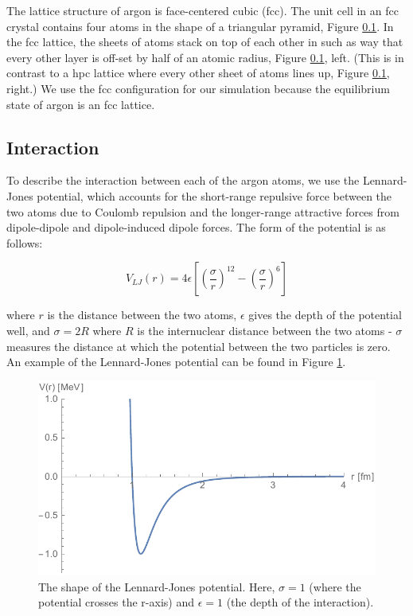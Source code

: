 \documentclass{article}
\begin{document}
\begin{multicols}{2}
The lattice structure of argon is face-centered cubic (fcc).  The unit cell in an fcc crystal contains four atoms in the shape of a triangular pyramid, Figure \ref{}.  In the fcc lattice, the sheets of atoms stack on top of each other in such as way that every other layer is off-set by half of an atomic radius, Figure \ref{}, left.  (This is in contrast to a hpc lattice where every other sheet of atoms lines up, Figure \ref{}, right.)  We use the fcc configuration for our simulation because the equilibrium state of argon is an fcc lattice.  

\subsection{Interaction}

To describe the interaction between each of the argon atoms, we use the Lennard-Jones potential, which accounts for the short-range repulsive force between the two atoms due to Coulomb repulsion and the longer-range attractive forces from dipole-dipole and dipole-induced dipole forces.  The form of the potential is as follows:

\begin{equation}
\label{LJpot}
V_{LJ}(r) = 4 \epsilon \left [ \left (\frac{\sigma}{r} \right )^{12} - \left (\frac{\sigma}{r} \right )^{6} \right ]
\end{equation}

\noindent where $r$ is the distance between the two atoms, $\epsilon$ gives the depth of the potential well, and $\sigma = 2R $ where $R$ is the internuclear distance between the two atoms - $\sigma$ measures the distance at which the potential between the two particles is zero.  An example of the Lennard-Jones potential can be found in Figure \ref{VLJfig}.

\begin{figure}[H]
\begin{center}
\includegraphics[width=\linewidth]{plots/VLJ.pdf}
\caption{The shape of the Lennard-Jones potential.  Here, $\sigma=1$ (where the potential crosses the r-axis) and $\epsilon =1$ (the depth of the interaction).}
\label{VLJfig}
\end{center}
\end{figure}


\end{multicols}
\end{document}
